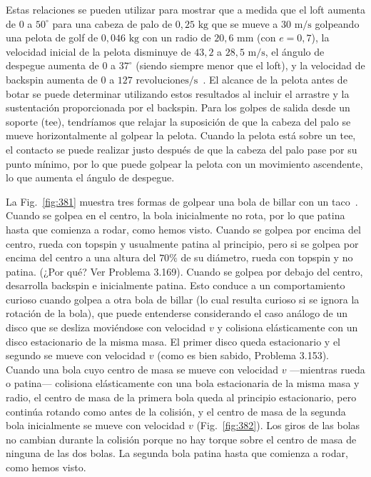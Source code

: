 \documentclass[12pt]{book}
\begin{document}
Estas relaciones se pueden utilizar para mostrar que a medida que el loft aumenta de $0$ a $50^\circ$ para una cabeza de palo de $0{,}25\text{ kg}$ que se mueve a $30\text{ m/s}$ golpeando una pelota de golf de $0{,}046\text{ kg}$ con un radio de $20{,}6\text{ mm}$ (con $e = 0{,}7$), la velocidad inicial de la pelota disminuye de $43{,}2$ a $28{,}5\text{ m/s}$, el ángulo de despegue aumenta de $0$ a $37^\circ$ (siendo siempre menor que el loft), y la velocidad de backspin aumenta de $0$ a $127\text{ revoluciones/s}$~\cite{ref36}. El alcance de la pelota antes de botar se puede determinar utilizando estos resultados al incluir el arrastre y la sustentación proporcionada por el backspin. Para los golpes de salida desde un soporte (tee), tendríamos que relajar la suposición de que la cabeza del palo se mueve horizontalmente al golpear la pelota. Cuando la pelota está sobre un tee, el contacto se puede realizar justo después de que la cabeza del palo pase por su punto mínimo, por lo que puede golpear la pelota con un movimiento ascendente, lo que aumenta el ángulo de despegue.

La Fig.~\ref{fig:381} muestra tres formas de golpear una bola de billar con un taco~\cite{ref31,ref36,ref135}. Cuando se golpea en el centro, la bola inicialmente no rota, por lo que patina hasta que comienza a rodar, como hemos visto. Cuando se golpea por encima del centro, rueda con topspin y usualmente patina al principio, pero si se golpea por encima del centro a una altura del $70\%$ de su diámetro, rueda con topspin y no patina. (¿Por qué? Ver Problema 3.169). Cuando se golpea por debajo del centro, desarrolla backspin e inicialmente patina. Esto conduce a un comportamiento curioso cuando golpea a otra bola de billar (lo cual resulta curioso si se ignora la rotación de la bola), que puede entenderse considerando el caso análogo de un disco que se desliza moviéndose con velocidad $v$ y colisiona elásticamente con un disco estacionario de la misma masa. El primer disco queda estacionario y el segundo se mueve con velocidad $v$ (como es bien sabido, Problema 3.153). Cuando una bola cuyo centro de masa se mueve con velocidad $v$ ---mientras rueda o patina--- colisiona elásticamente con una bola estacionaria de la misma masa y radio, el centro de masa de la primera bola queda al principio estacionario, pero continúa rotando como antes de la colisión, y el centro de masa de la segunda bola inicialmente se mueve con velocidad $v$ (Fig.~\ref{fig:382}). Los giros de las bolas no cambian durante la colisión porque no hay torque sobre el centro de masa de ninguna de las dos bolas. La segunda bola patina hasta que comienza a rodar, como hemos visto.
\end{document}
